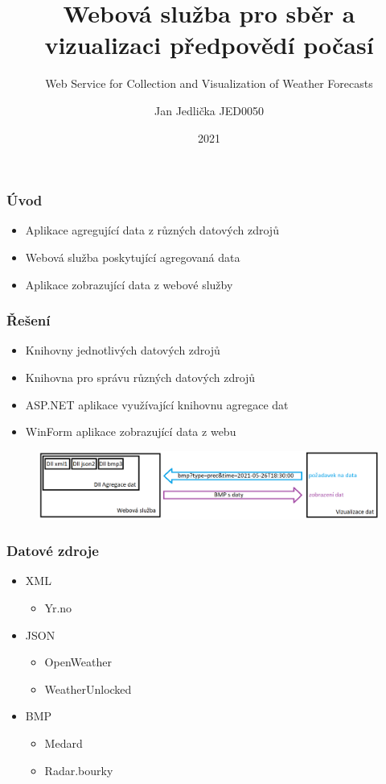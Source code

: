 \documentclass{beamer}
\title{Webová služba pro sběr a vizualizaci předpovědí počasí}
\subtitle{Web Service for Collection and Visualization of Weather Forecasts}
\author{Jan Jedlička JED0050}
\institute{VŠB-TUO}
\date{2021}
\begin{document}
	
	\frame{\titlepage}
	
	\begin{frame}
		\frametitle{Úvod}
		
		\begin{itemize}
			\item Aplikace agregující data z různých datových zdrojů
			\item Webová služba poskytující agregovaná data
			\item Aplikace zobrazující data z webové služby
		\end{itemize}
		
	\end{frame}

	\begin{frame}
		\frametitle{Řešení}
		
		\begin{itemize}
			\item Knihovny jednotlivých datových zdrojů
			\item Knihovna pro správu různých datových zdrojů
			\item ASP.NET aplikace využívající knihovnu agregace dat
			\item WinForm aplikace zobrazující data z webu
		\end{itemize}
		
		\begin{figure}
			
			\includegraphics[scale=0.323]{figures/schema prace.png}

		\end{figure}
		
	\end{frame}

	\begin{frame}
		\frametitle{Datové zdroje}
		
		\begin{itemize}
			\item XML
			\begin{itemize}
				\item Yr.no
			\end{itemize}
			\item JSON
			\begin{itemize}
				\item OpenWeather
				\item WeatherUnlocked
			\end{itemize}
			\item BMP
			\begin{itemize}
				\item Medard
				\item Radar.bourky
			\end{itemize}
		\end{itemize}
	\end{frame}
\end{document}
